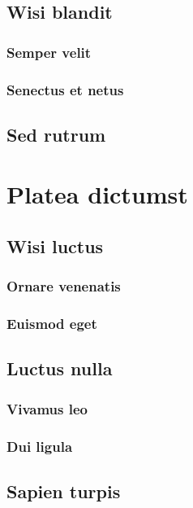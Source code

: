 \subsection{Wisi blandit} \lipsum[8]
\subsubsection{Semper velit} \lipsum[9]
\subsubsection{Senectus et netus} \lipsum[10]
\subsection{Sed rutrum} \lipsum[11-12]

\section{Platea dictumst} \lipsum[13-14]
\subsection{Wisi luctus} \lipsum[15]
\subsubsection{Ornare venenatis} \lipsum[16]
\subsubsection{Euismod eget} \lipsum[17]
\subsection{Luctus nulla} \lipsum [18]
\subsubsection{Vivamus leo} \lipsum[19]
\subsubsection{Dui ligula} \lipsum[20]
\subsection{Sapien turpis} \lipsum [21-22]
